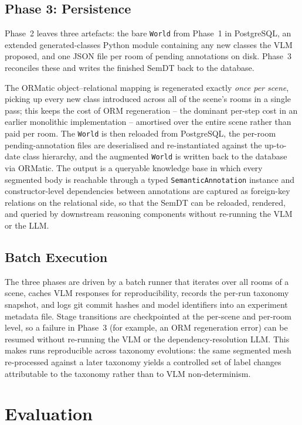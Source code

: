 \documentclass[conference]{IEEEtran}
\begin{document}
\subsection{Phase 3: Persistence}
\label{sec:persist}

Phase~2 leaves three artefacts: the bare \texttt{World} from Phase~1
in PostgreSQL, an extended generated-classes Python module containing
any new classes the VLM proposed, and one JSON file per room of
pending annotations on disk. Phase~3 reconciles these and writes the
finished SemDT back to the database.

The ORMatic object--relational mapping is regenerated exactly
\emph{once per scene}, picking up every new class introduced across
all of the scene's rooms in a single pass; this keeps the cost of ORM
regeneration -- the dominant per-step cost in an earlier monolithic
implementation -- amortised over the entire scene rather than paid per
room. The \texttt{World} is then reloaded from PostgreSQL, the
per-room pending-annotation files are deserialised and re-instantiated
against the up-to-date class hierarchy, and the augmented
\texttt{World} is written back to the database via ORMatic. The output
is a queryable knowledge base in which every segmented body is
reachable through a typed \texttt{SemanticAnnotation} instance and
constructor-level dependencies between annotations are captured as
foreign-key relations on the relational side, so that the SemDT can be
reloaded, rendered, and queried by downstream reasoning components
without re-running the VLM or the LLM.

\subsection{Batch Execution}

The three phases are driven by a batch runner that iterates over all
rooms of a scene, caches VLM responses for reproducibility, records
the per-run taxonomy snapshot, and logs git commit hashes and model
identifiers into an experiment metadata file. Stage transitions are
checkpointed at the per-scene and per-room level, so a failure in
Phase~3 (for example, an ORM regeneration error) can be resumed
without re-running the VLM or the dependency-resolution LLM. This
makes runs reproducible across taxonomy evolutions: the same segmented
mesh re-processed against a later taxonomy yields a controlled set of
label changes attributable to the taxonomy rather than to VLM
non-determinism.

\section{Evaluation}
\label{sec:eval}
\end{document}
